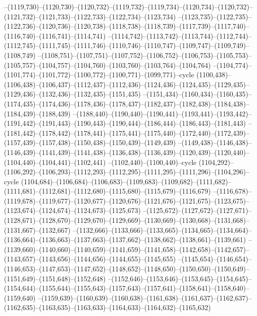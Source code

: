 --(1119,730)--(1120,730)--(1120,732)--(1119,732)--(1119,734)--(1120,734)--(1120,732)--(1121,732)--(1121,733)--(1122,733)--(1122,734)--(1123,734)
--(1123,735)--(1122,735)--(1122,736)--(1120,736)--(1120,738)--(1118,738)--(1118,739)--(1117,739)--(1117,740)--(1116,740)--(1116,741)--(1114,741)
--(1114,742)--(1113,742)--(1113,744)--(1112,744)--(1112,745)--(1111,745)--(1111,746)--(1110,746)--(1110,747)--(1109,747)--(1109,749)--(1108,749)
--(1108,751)--(1107,751)--(1107,752)--(1106,752)--(1106,753)--(1105,753)--(1105,757)--(1104,757)--(1104,760)--(1103,760)--(1103,764)--(1104,764)
--(1104,774)--(1101,774)--(1101,772)--(1100,772)--(1100,771)--(1099,771)--cycle
(1100,438)--(1106,438)--(1106,437)--(1112,437)--(1112,436)--(1124,436)--(1124,435)--(1129,435)--(1129,436)--(1132,436)--(1132,435)--(1151,435)
--(1151,434)--(1160,434)--(1160,435)--(1174,435)--(1174,436)--(1178,436)--(1178,437)--(1182,437)--(1182,438)--(1184,438)--(1184,439)--(1188,439)
--(1188,440)--(1190,440)--(1190,441)--(1193,441)--(1193,442)--(1191,442)--(1191,443)--(1190,443)--(1190,444)--(1186,444)--(1186,443)--(1181,443)
--(1181,442)--(1178,442)--(1178,441)--(1175,441)--(1175,440)--(1172,440)--(1172,439)--(1157,439)--(1157,438)--(1150,438)--(1150,439)--(1149,439)
--(1149,438)--(1146,438)--(1146,439)--(1141,439)--(1141,438)--(1136,438)--(1136,439)--(1120,439)--(1120,440)--(1104,440)--(1104,441)--(1102,441)
--(1102,440)--(1100,440)--cycle
(1104,292)--(1106,292)--(1106,293)--(1112,293)--(1112,295)--(1111,295)--(1111,296)--(1104,296)--cycle
(1104,684)--(1106,684)--(1106,683)--(1109,683)--(1109,682)--(1111,682)--(1111,681)--(1112,681)--(1112,680)--(1115,680)--(1115,679)--(1116,679)
--(1116,678)--(1119,678)--(1119,677)--(1120,677)--(1120,676)--(1121,676)--(1121,675)--(1123,675)--(1123,674)--(1124,674)--(1124,673)--(1125,673)
--(1125,672)--(1127,672)--(1127,671)--(1128,671)--(1128,670)--(1129,670)--(1129,669)--(1130,669)--(1130,668)--(1131,668)--(1131,667)--(1132,667)
--(1132,666)--(1133,666)--(1133,665)--(1134,665)--(1134,664)--(1136,664)--(1136,663)--(1137,663)--(1137,662)--(1138,662)--(1138,661)--(1139,661)
--(1139,660)--(1140,660)--(1140,659)--(1141,659)--(1141,658)--(1142,658)--(1142,657)--(1143,657)--(1143,656)--(1144,656)--(1144,655)--(1145,655)
--(1145,654)--(1146,654)--(1146,653)--(1147,653)--(1147,652)--(1148,652)--(1148,650)--(1150,650)--(1150,649)--(1151,649)--(1151,648)--(1152,648)
--(1152,646)--(1153,646)--(1153,645)--(1154,645)--(1154,644)--(1155,644)--(1155,643)--(1157,643)--(1157,641)--(1158,641)--(1158,640)--(1159,640)
--(1159,639)--(1160,639)--(1160,638)--(1161,638)--(1161,637)--(1162,637)--(1162,635)--(1163,635)--(1163,633)--(1164,633)--(1164,632)--(1165,632)
